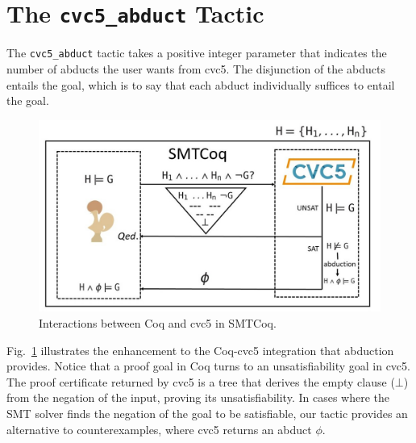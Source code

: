 \documentclass[conference]{IEEEtran}
\begin{document}
\section{The \texttt{cvc5\_abduct} Tactic}
  The \texttt{cvc5\_abduct} tactic takes a positive 
  integer parameter that indicates the number of 
  abducts the user wants from cvc5. The disjunction 
  of the abducts entails the goal, which is to 
  say that each abduct individually suffices to 
  entail the goal.
  
  \begin{figure}[htbp]
  	\centerline{\includegraphics[scale=0.25]{abd.jpg}}
  	\caption{Interactions between Coq and cvc5 in 
  		SMTCoq.}
  	\label{fig}
  \end{figure}
  Fig.~\ref{fig} illustrates the enhancement 
  to the Coq-cvc5 integration that abduction 
  provides.
  Notice that a proof goal in Coq turns to an 
  unsatisfiability goal in cvc5. The proof 
  certificate returned by cvc5 is a tree that 
  derives the empty clause ($\bot$) from the 
  negation of the input, proving its 
  unsatisfiability. In cases where the SMT solver
  finds the negation of the goal to be satisfiable, 
  our tactic provides an alternative to 
  counterexamples, where cvc5 returns an abduct 
  $\phi$.
  
\end{document}
